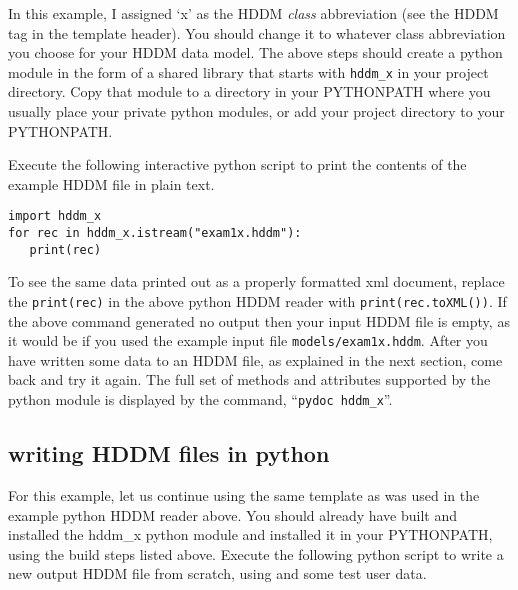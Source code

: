 \documentclass{revtex4}
\begin{document}
In this example, I assigned `x' as the HDDM {\em class} abbreviation (see the HDDM
tag in the template header). You should change it to whatever class abbreviation
you choose for your HDDM data model. The above steps should create a python module
in the form of a shared library that starts with \texttt{hddm\_x} in your project
directory. Copy that module to a directory in your PYTHONPATH where you usually
place your private python modules, or add your project directory to your 
PYTHONPATH.

Execute the following interactive python script to print the contents of the
example HDDM file in plain text.

\vspace{0.5cm}
\begin{minipage}{12cm}
\begin{verbatim}
import hddm_x
for rec in hddm_x.istream("exam1x.hddm"):
   print(rec)
\end{verbatim}
\end{minipage}
\vspace{0.5cm}

To see the same data printed out as a properly formatted xml document, replace
the \texttt{print(rec)} in the above python HDDM reader with 
\texttt{print(rec.toXML())}. 
If the above command generated no output then your input HDDM file is empty, as it
would be if you used the example input file \texttt{models/exam1x.hddm}. After you
have written some data to an HDDM file, as explained in the next section, come back
and try it again. The full set of methods and attributes supported by the python
module is displayed by the command, ``\texttt{pydoc hddm\_x}''.

\subsection{writing HDDM files in python}

For this example, let us continue using the same template as was used in the
example python HDDM reader above. You should already have built and installed
the hddm\_x python module and installed it in your PYTHONPATH, using the build
steps listed above. Execute the following python script to write a new output
HDDM file from scratch, using and some test user data.
\end{document}

